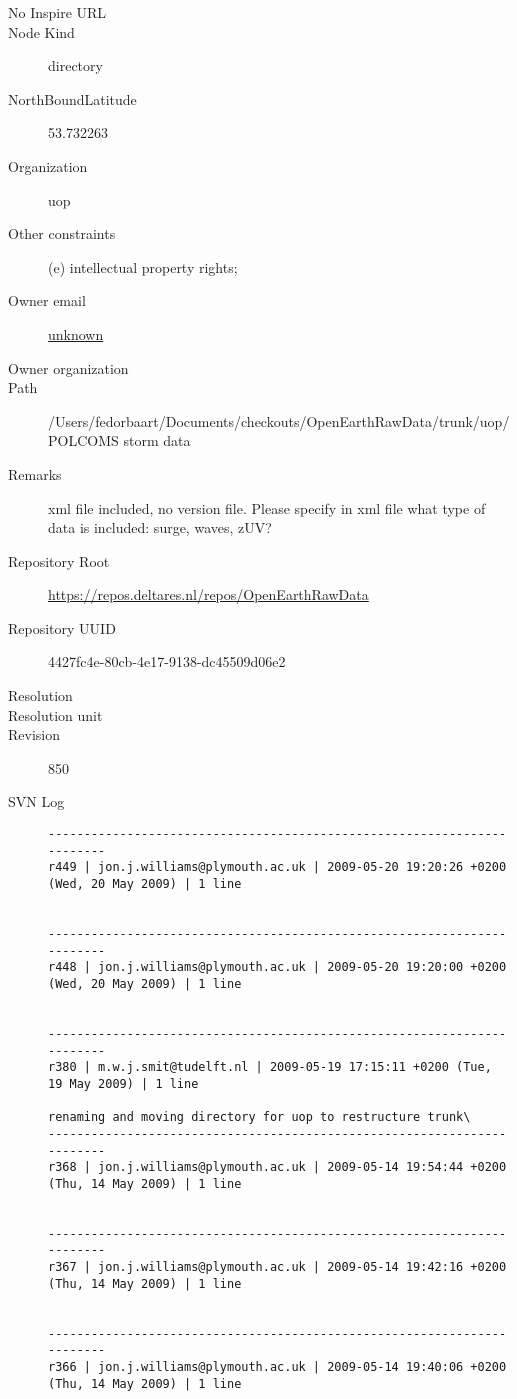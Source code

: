 \documentclass[9]{report}
\begin{document}
\begin{description}
  \item[No Inspire URL] 
  \item[Node Kind] directory
  \item[NorthBoundLatitude] 53.732263
  \item[Organization] uop
  \item[Other constraints] (e) intellectual property rights;
  \item[Owner email] \href{mailto:unknown}{unknown}
  \item[Owner organization] 
  \item[Path] /Users/fedorbaart/Documents/checkouts/OpenEarthRawData/trunk/uop/POLCOMS storm data
  \item[Remarks] xml file included, no version file. Please specify in xml file what type of data is included: surge, waves, zUV?
  \item[Repository Root] \href{https://repos.deltares.nl/repos/OpenEarthRawData}{https://repos.deltares.nl/repos/OpenEarthRawData}
  \item[Repository UUID] 4427fc4e-80cb-4e17-9138-dc45509d06e2
  \item[Resolution] 
  \item[Resolution unit] 
  \item[Revision] 850
  \item[SVN Log] \begin{verbatim}
------------------------------------------------------------------------
r449 | jon.j.williams@plymouth.ac.uk | 2009-05-20 19:20:26 +0200 (Wed, 20 May 2009) | 1 line


------------------------------------------------------------------------
r448 | jon.j.williams@plymouth.ac.uk | 2009-05-20 19:20:00 +0200 (Wed, 20 May 2009) | 1 line


------------------------------------------------------------------------
r380 | m.w.j.smit@tudelft.nl | 2009-05-19 17:15:11 +0200 (Tue, 19 May 2009) | 1 line

renaming and moving directory for uop to restructure trunk\
------------------------------------------------------------------------
r368 | jon.j.williams@plymouth.ac.uk | 2009-05-14 19:54:44 +0200 (Thu, 14 May 2009) | 1 line


------------------------------------------------------------------------
r367 | jon.j.williams@plymouth.ac.uk | 2009-05-14 19:42:16 +0200 (Thu, 14 May 2009) | 1 line


------------------------------------------------------------------------
r366 | jon.j.williams@plymouth.ac.uk | 2009-05-14 19:40:06 +0200 (Thu, 14 May 2009) | 1 line



\end{verbatim}
\end{description}
\end{document}
